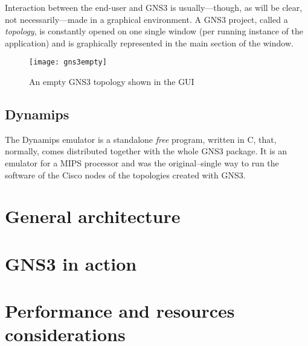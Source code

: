 Interaction between the end-user and GNS3 is usually---though, as will be clear, not necessarily---made in a graphical environment.
A GNS3 project, called a \emph{topology}, is constantly opened on one single window (per running instance of the application) and is graphically represented in the main section of the window.

\begin{figure}
  \centering
  \texttt{[image: gns3empty]}
  \caption{An empty GNS3 topology shown in the GUI}
\end{figure}

\subsection{Dynamips}
\label{subsec:gns3dynamips}

The Dynamips emulator is a standalone \emph{free} program, written in C, that, normally, comes distributed together with the whole GNS3 package.
It is an emulator for a MIPS processor and was the original--single way to run the software of the Cisco nodes of the topologies created with GNS3.


\section{General architecture}
\label{sec:gns3architecture}


\section{GNS3 in action}
\label{sec:gns3inaction}


\section{Performance and resources considerations}
\label{sec:gns3performance}


